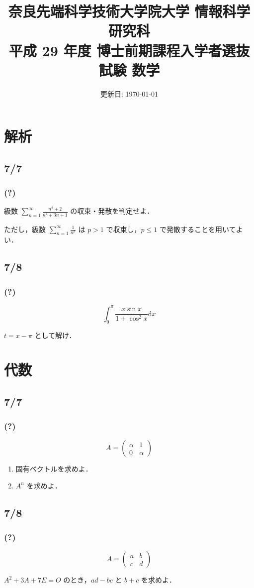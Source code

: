 \documentclass[12pt, dvipdfmx, a4paper]{jsarticle}
\title{
  奈良先端科学技術大学院大学 情報科学研究科 \\
  平成 29 年度 博士前期課程入学者選抜試験 数学
}
\date{更新日: \today}
\begin{document}
\maketitle

\section*{解析}
\subsection*{7/7}
\subsubsection*{(?)}
級数 $\sum_{n = 1}^\infty \frac{n^2 + 2}{n^4 + 3n + 1}$ の収束・発散を判定せよ．

ただし，級数 $\sum_{n = 1}^\infty \frac{1}{n^p}$ は
$p > 1$ で収束し，$p \leq 1$ で発散することを用いてよい．

\subsection*{7/8}
\subsubsection*{(?)}
\[
  \int_0^\pi \frac{x \sin x}{1 + \cos^2 x}　\mathrm{d}x
\]

$t = x - \pi$ として解け．


\clearpage


\section*{代数}
\subsection*{7/7}
\subsubsection*{(?)}

\[
  A = \begin{pmatrix} \alpha & 1 \\ 0 & \alpha \end{pmatrix}
\]

\begin{enumerate}
  \item 固有ベクトルを求めよ．
  \item $A^n$ を求めよ．
\end{enumerate}

\subsection*{7/8}
\subsubsection*{(?)}
\[
  A = \begin{pmatrix} a & b \\ c & d \end{pmatrix}
\]

$A^2 + 3A + 7E = O$ のとき，$ad - bc$ と $b + c$ を求めよ．
\end{document}
